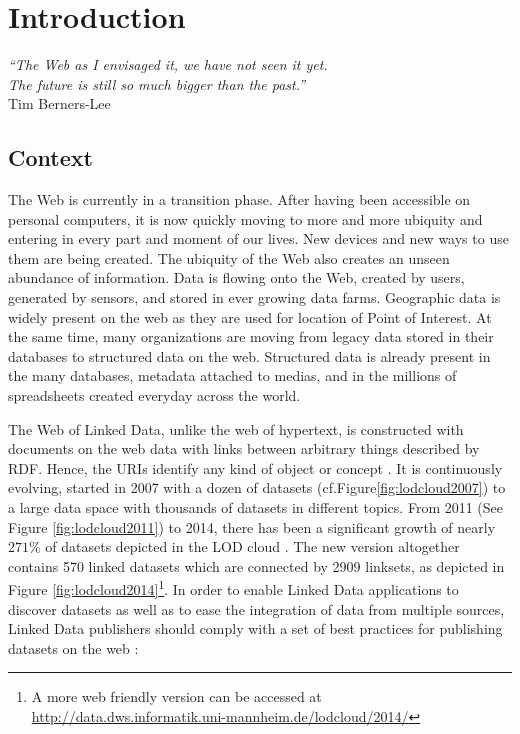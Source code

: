 \chapter{Introduction}
\label{intro}

\begin{flushright}
\textit{``The Web as I envisaged it, we have not seen it yet.\\ 
The future is still so much bigger than the past.''\\}
Tim Berners-Lee
\end{flushright}


\section{Context}
\label{sec:context}
The Web is currently in a transition phase. After having been accessible on personal computers, it is now 
quickly moving to more and more ubiquity and entering in every part and moment of our lives. New devices and new ways to use them are being created. The ubiquity of the Web also creates an unseen 
abundance of information. Data is flowing onto the Web, created by users, generated by sensors, and stored in ever growing data farms. Geographic data is widely present on the web as they are used for location of Point of Interest. At the same time, many organizations are moving from legacy data stored in their databases
to structured data on the web. Structured data is already present in the many databases, metadata attached to medias, and in the millions of spreadsheets created everyday across the world.

The Web of Linked Data, unlike the web of hypertext, is constructed with documents on the web data with links between arbitrary things described by RDF. Hence, the URIs identify any kind of object or concept \cite{timld}. It is continuously evolving, started in 2007 with a dozen of datasets (cf.Figure\ref{fig:lodcloud2007}) to a large data space with thousands of datasets in different topics. From 2011 (See Figure \ref{fig:lodcloud2011})\cite{jentzsch2011} to 2014, there has been a significant growth of nearly $271\%$ of datasets depicted in the LOD cloud \cite{max2014}. The new version altogether contains 570 linked datasets which are connected by 2909 linksets, as depicted in Figure \ref{fig:lodcloud2014}\footnote{A more web friendly version can be accessed at \url{http://data.dws.informatik.uni-mannheim.de/lodcloud/2014/}}. In order to enable
Linked Data applications to discover datasets as well as to ease the integration of data from multiple sources, Linked Data publishers should comply with a set of best practices for publishing datasets on the web \cite{Heath2011}:

